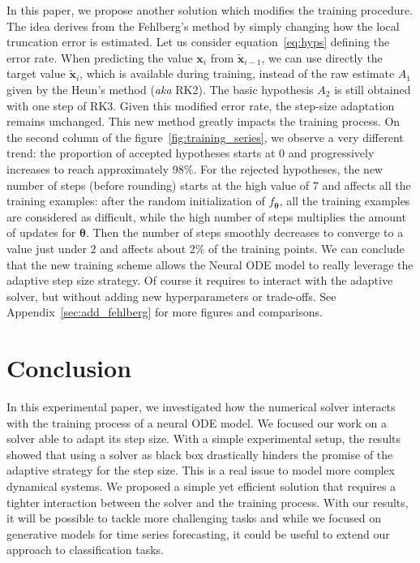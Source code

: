 \documentclass{article}
\newcommand{\x}{\ensuremath{\mathbf{x}}} %
\newcommand{\tx}{\ensuremath{\tilde{\mathbf{x}}}} %
\newcommand{\params}{\ensuremath{\boldsymbol{\theta}}}
\newcommand{\nnet}{\ensuremath{f_{\params}}}
\begin{document}
In this paper, we propose another solution which modifies the training
procedure. The idea derives from the Fehlberg's method by simply
changing how the local truncation error is estimated. Let us consider
equation~\ref{eq:hyps} defining the error rate.  When predicting the
value $\x_i$ from $\tx_{i-1}$, we can use directly the target value
$\tx_i$, which is available during training, instead of the raw
estimate $A_1$ given by the Heun's method (\textit{aka} RK2). The
basic hypothesis $A_2$ is still obtained with one step of RK3.
Given this modified error rate, the step-size adaptation remains
unchanged. This new method greatly impacts the training process. On
the second column of the figure~\ref{fig:training_series}, we observe
a very different trend: the proportion of accepted hypotheses starts at 0 and 
progressively increases to reach approximately 98\%.
For the rejected hypotheses, the new number of steps (before rounding)
starts at the high value of $7$ and affects all the training examples:
after the random initialization of $\nnet$, all the training examples
are considered as difficult, while the high number of steps multiplies
the amount of updates for $\params$.  Then the number of steps
smoothly decreases to converge to a value just under $2$ and affects
about 2\% of the training points. We can conclude that the new
training scheme allows the Neural ODE model to really leverage the
adaptive step size strategy. Of course it requires to interact with
the adaptive solver, but without adding new hyperparameters or
trade-offs. See Appendix~\ref{sec:add_fehlberg} for more figures and
comparisons.


\section{Conclusion}
In this experimental paper, we investigated how the numerical solver
interacts with the training process of a neural ODE model. We focused
our work on a solver able to adapt its step size.  With a simple
experimental setup, the results showed that using a solver as black
box drastically hinders the promise of the adaptive strategy for the
step size. This is a real issue to model more complex dynamical
systems. We proposed a simple yet efficient solution that requires a
tighter interaction between the solver and the training process. With
our results, it will be possible to tackle more challenging tasks and
while we focused on generative models for time series forecasting, it
could be useful to extend our approach to classification tasks.
\end{document}
